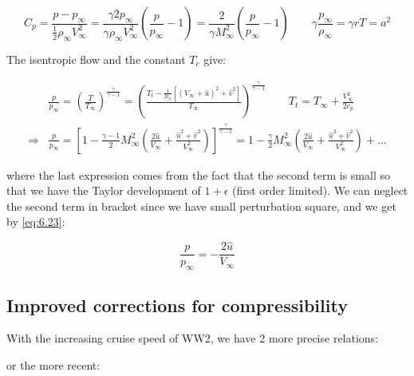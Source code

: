 	\begin{equation}
	C_p = \frac{p-p_\infty}{\frac{1}{2}\rho _\infty V_\infty^2} = \frac{\gamma 2p_\infty}{\gamma \rho _\infty V_\infty ^2}\left(\frac{p}{p_\infty}-1 \right) =  \frac{2}{\gamma M^2_\infty} \left(\frac{p}{p_\infty} -1 \right) \qquad \gamma \frac{p_\infty}{\rho _\infty} = \gamma rT = a^2
	\label{eq:6.23}
	\end{equation}
	
	The isentropic flow and the constant $T_c$ give: 
	
	\begin{equation}
	\begin{aligned}
	&\frac{p}{p_\infty}  =\left( \frac{T}{T_\infty} \right) ^{\frac{\gamma}{\gamma - 1}} = \left( \frac{T_t - \frac{1}{2c_p}\left[ (V_\infty +\hat{u})^2 +\hat{v}^2 \right]}{T_\infty} \right)^{\frac{\gamma}{\gamma-1}} \qquad T_t = T_\infty + \frac{V_\infty^2}{2c_p}\\
	\Rightarrow &\frac{p}{p_\infty}  =\left[ 1- \frac{\gamma -1}{2}M^2_\infty \left( \frac{2\hat{u}}{V_\infty} +\frac{\hat{u}^2 +\hat{v}^2}{V^2_\infty} \right) \right]^{\frac{\gamma}{\gamma-1}} = 1- \frac{\gamma}{2}M^2_\infty \left( \frac{2\hat{u}}{V_\infty} +\frac{\hat{u}^2 +\hat{v}^2}{V^2_\infty} \right)+\dots
	\end{aligned}
	\end{equation}
	
	where the last expression comes from the fact that the second term is small so that we have the Taylor development of $1+\epsilon$ (first order limited). We can neglect the second term in bracket since we have small perturbation square, and we get by \eqref{eq:6.23}:
	
	\begin{equation}
	\frac{p}{p_\infty} = -\frac{2\hat{u}}{V_\infty}
	\end{equation}
	
\subsection{Improved corrections for compressibility}
	With the increasing cruise speed of WW2, we have 2 more precise relations:
	
	\begin{center}
	\end{center}
or the more recent:

